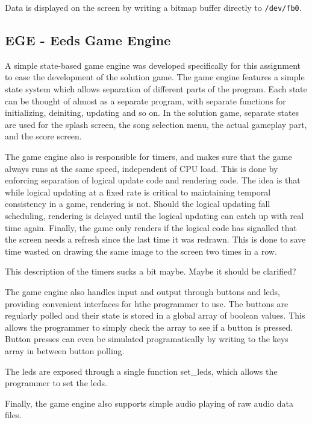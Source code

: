 Data is displayed on the screen by writing a bitmap buffer directly to \texttt{/dev/fb0}.


        \subsection{EGE  - Eeds Game Engine}

    A simple state-based game engine was developed specifically for this assignment to ease the development of the solution game.
    The game engine features a simple state system which allows separation of different parts of the program.
    Each state can be thought of almost as a separate program, with separate functions for initializing, deiniting, updating and so on.
    In the solution game, separate states are used for the splash screen, the song selection menu, the actual gameplay part, and the score screen.

    The game engine also is responsible for timers, and makes sure that the game always runs at the same speed, independent of CPU load.
    This is done by enforcing separation of logical update code and rendering code.
    The idea is that while logical updating at a fixed rate is critical to maintaining temporal consistency in a game, rendering is not.
    Should the logical updating fall scheduling, rendering is delayed until the logical updating can catch up with real time again.
    Finally, the game only renders if the logical code has signalled that the screen needs a refresh since the last time it was redrawn. This is done to save time wasted on drawing the same image to the screen two times in a row.

    This description of the timers sucks a bit maybe. Maybe it should be clarified?


    The game engine also handles input and output through buttons and leds, providing convenient interfaces for hthe programmer to use.
    The buttons are regularly polled and their state is stored in a global array of boolean values.
    This allows the programmer to simply check the array to see if a button is pressed.
    Button presses can even be simulated programatically by writing to the keys array in between button polling.



    The leds are exposed through a single function set_leds, which allows the programmer to set the leds.


    Finally, the game engine also supports simple audio playing of raw audio data files.
    

